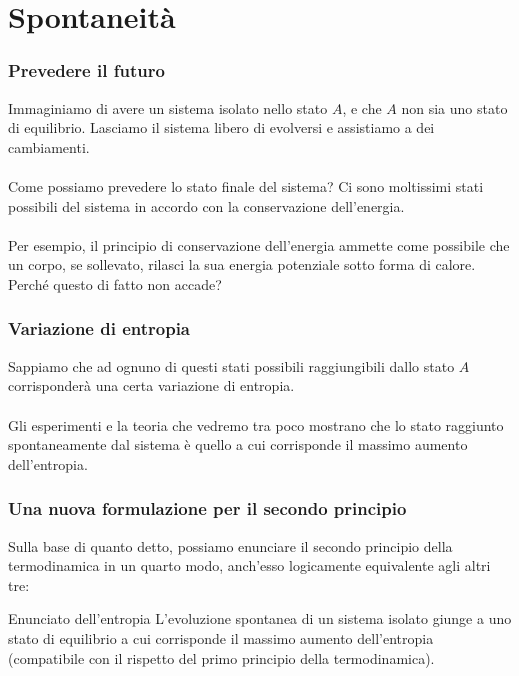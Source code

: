 \documentclass[]{beamer}
\theoremstyle{plain}
\begin{document}
\section{Spontaneità}

\begin{frame}
  \frametitle{Prevedere il futuro}
  Immaginiamo di avere un sistema isolato nello stato $ A $, e che $ A $ non sia uno stato di equilibrio. Lasciamo il sistema libero di evolversi e assistiamo a dei cambiamenti.{\pause\\~\\} Come possiamo prevedere lo stato finale del sistema? Ci sono moltissimi stati possibili del sistema in accordo con la conservazione dell'energia.\pause\\~\\
  Per esempio, il principio di conservazione dell'energia ammette come possibile che un corpo, se sollevato, rilasci la sua energia potenziale sotto forma di calore. Perché questo di fatto non accade?
\end{frame}


\begin{frame}
  \frametitle{Variazione di entropia}
  Sappiamo che ad ognuno di questi stati possibili raggiungibili dallo stato $ A $ corrisponderà una certa variazione di entropia.\\~\pause\\
  Gli esperimenti e la teoria che vedremo tra poco mostrano che lo stato raggiunto spontaneamente dal sistema è quello a cui corrisponde il \alert<2>{massimo aumento dell'entropia}.  
\end{frame}


\begin{frame}
  \frametitle{Una nuova formulazione per il secondo principio}
  Sulla base di quanto detto, possiamo enunciare il secondo principio della termodinamica in un quarto modo, anch'esso logicamente equivalente agli altri tre:\pause
  \begin{block}{Enunciato dell'entropia}
    L'evoluzione spontanea di un sistema isolato giunge a uno stato di equilibrio a cui corrisponde il massimo aumento dell’entropia (compatibile con il rispetto del primo principio della termodinamica).
  \end{block}
\end{frame}
\end{document}
